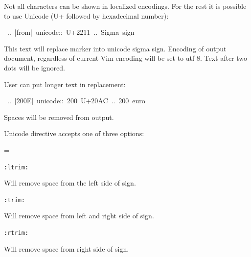\documentclass[12pt]{article}
\newenvironment{deflist}[1]{%
\begin{list}{}
{\renewcommand{\makelabel}[1]{\textbf{##1}\hfill}
\settowidth{\labelwidth}{\textbf{#1}}
\leftmargin=\labelwidth
\advance \leftmargin\labelsep}}
{\end{list}}
\begin{document}
Not all characters can be shown in localized encodings. For the rest it is
possible to use Unicode (U+ followed by hexadecimal number):

\begin{ttfamily}\begin{flushleft}
\mbox{~..~|from|~unicode::~U+2211~..~Sigma~sign}\\
\end{flushleft}\end{ttfamily}

This text will replace marker into unicode sigma sign. Encoding of output
document, regardless of current Vim encoding will be set to utf-8. Text after
two dots will be ignored.

User can put longer text in replacement:

\begin{ttfamily}\begin{flushleft}
\mbox{~..~|200E|~unicode::~200~U+20AC~..~200~euro}\\
\end{flushleft}\end{ttfamily}

Spaces will be removed from output.

Unicode directive accepts one of three options:

\begin{deflist}{iii}

\item[\texttt{:ltrim:}]

Will remove space from the left side of sign.

\item[\texttt{:trim:}]

Will remove space from left and right side of sign.

\item[\texttt{:rtrim:}]

Will remove space from right side of sign.
\end{deflist}
\begin{center}
\end{center}
\hypertarget{ldate}{}
\end{document}
